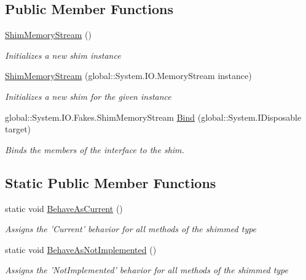 \subsection*{Public Member Functions}
\begin{DoxyCompactItemize}
\item 
\hyperlink{class_system_1_1_i_o_1_1_fakes_1_1_shim_memory_stream_ae1ca55ab18c25d508fe2bae672074cf3}{Shim\-Memory\-Stream} ()
\begin{DoxyCompactList}\small\item\em Initializes a new shim instance\end{DoxyCompactList}\item 
\hyperlink{class_system_1_1_i_o_1_1_fakes_1_1_shim_memory_stream_a3a9208158d8791ea574bb40839916e1f}{Shim\-Memory\-Stream} (global\-::\-System.\-I\-O.\-Memory\-Stream instance)
\begin{DoxyCompactList}\small\item\em Initializes a new shim for the given instance\end{DoxyCompactList}\item 
global\-::\-System.\-I\-O.\-Fakes.\-Shim\-Memory\-Stream \hyperlink{class_system_1_1_i_o_1_1_fakes_1_1_shim_memory_stream_a773a56a496c3fd1d685e5722954d9689}{Bind} (global\-::\-System.\-I\-Disposable target)
\begin{DoxyCompactList}\small\item\em Binds the members of the interface to the shim.\end{DoxyCompactList}\end{DoxyCompactItemize}
\subsection*{Static Public Member Functions}
\begin{DoxyCompactItemize}
\item 
static void \hyperlink{class_system_1_1_i_o_1_1_fakes_1_1_shim_memory_stream_af855f31554fef29b6e7d02cecdb409ae}{Behave\-As\-Current} ()
\begin{DoxyCompactList}\small\item\em Assigns the 'Current' behavior for all methods of the shimmed type\end{DoxyCompactList}\item 
static void \hyperlink{class_system_1_1_i_o_1_1_fakes_1_1_shim_memory_stream_a2694e5f37a84b5c82d7a6e809274479e}{Behave\-As\-Not\-Implemented} ()
\begin{DoxyCompactList}\small\item\em Assigns the 'Not\-Implemented' behavior for all methods of the shimmed type\end{DoxyCompactList}\end{DoxyCompactItemize}

